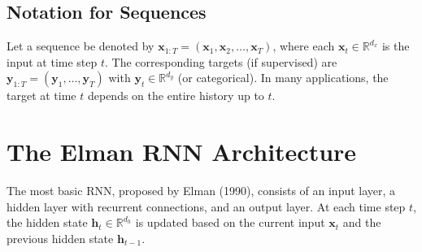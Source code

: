 \documentclass{tufte-handout}
\begin{document}
\begin{marginfigure}
\centering
{}
\caption{Unrolled RNN: the same recurrent cell is applied at each time step, sharing weights across time.}
\end{marginfigure}

\subsection{Notation for Sequences}

Let a sequence be denoted by $\mathbf{x}_{1:T} = (\mathbf{x}_1, \mathbf{x}_2, \dots, \mathbf{x}_T)$, where each $\mathbf{x}_t \in \mathbb{R}^{d_x}$ is the input at time step $t$. The corresponding targets (if supervised) are $\mathbf{y}_{1:T} = (\mathbf{y}_1, \dots, \mathbf{y}_T)$ with $\mathbf{y}_t \in \mathbb{R}^{d_y}$ (or categorical). In many applications, the target at time $t$ depends on the entire history up to $t$.

\section{The Elman RNN Architecture}

The most basic RNN, proposed by Elman (1990), consists of an input layer, a hidden layer with recurrent connections, and an output layer. At each time step $t$, the hidden state $\mathbf{h}_t \in \mathbb{R}^{d_h}$ is updated based on the current input $\mathbf{x}_t$ and the previous hidden state $\mathbf{h}_{t-1}$.
\end{document}
